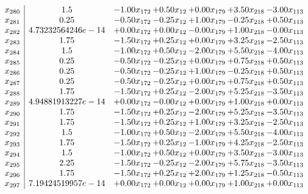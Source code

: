 \documentclass[8pt]{article}
\begin{document}
\[\begin{array}{c| c c@{\hskip 2pt} c@{\hskip 2pt} c@{\hskip 2pt} c@{\hskip 2pt} c@{\hskip 2pt} }
 x_{280}   &  1.5 & -1.00 x_{172} & +  0.50 x_{12} & +  0.00 x_{179} & +  3.50 x_{218} & -3.00 x_{113}\\
 x_{281}   &  0.25 & -0.50 x_{172} & -0.25 x_{12} & +  1.00 x_{179} & -0.25 x_{218} & +  0.50 x_{113}\\
 x_{282}   &  4.73232564246e-14 & +  0.00 x_{172} & +  0.00 x_{12} & -0.00 x_{179} & +  1.00 x_{218} & -0.00 x_{113}\\
 x_{283}   &  1.75 & -1.50 x_{172} & +  0.25 x_{12} & +  0.00 x_{179} & +  3.25 x_{218} & -2.50 x_{113}\\
 x_{284}   &  1.5 & -1.00 x_{172} & +  0.50 x_{12} & -2.00 x_{179} & +  5.50 x_{218} & -4.00 x_{113}\\
 x_{285}   &  0.25 & -0.50 x_{172} & -0.25 x_{12} & +  0.00 x_{179} & +  0.75 x_{218} & +  0.50 x_{113}\\
 x_{286}   &  0.25 & -0.50 x_{172} & -0.25 x_{12} & +  1.00 x_{179} & -0.25 x_{218} & +  0.50 x_{113}\\
 x_{287}   &  0.25 & -0.50 x_{172} & -0.25 x_{12} & +  0.00 x_{179} & +  0.75 x_{218} & +  0.50 x_{113}\\
 x_{288}   &  1.75 & -1.50 x_{172} & +  0.25 x_{12} & -2.00 x_{179} & +  5.25 x_{218} & -3.50 x_{113}\\
 x_{289}   &  4.94881913227e-14 & +  0.00 x_{172} & -0.00 x_{12} & +  0.00 x_{179} & +  1.00 x_{218} & +  0.00 x_{113}\\
 x_{290}   &  1.75 & -1.50 x_{172} & +  0.25 x_{12} & -2.00 x_{179} & +  5.25 x_{218} & -3.50 x_{113}\\
 x_{291}   &  1.75 & -1.50 x_{172} & +  0.25 x_{12} & +  1.00 x_{179} & +  3.25 x_{218} & -2.50 x_{113}\\
 x_{292}   &  1.5 & -1.00 x_{172} & +  0.50 x_{12} & -2.00 x_{179} & +  5.50 x_{218} & -4.00 x_{113}\\
 x_{293}   &  1.75 & -1.50 x_{172} & +  0.25 x_{12} & -1.00 x_{179} & +  4.25 x_{218} & -2.50 x_{113}\\
 x_{294}   &  1.5 & -1.00 x_{172} & +  0.50 x_{12} & +  0.00 x_{179} & +  3.50 x_{218} & -3.00 x_{113}\\
 x_{295}   &  2.25 & -1.50 x_{172} & -0.25 x_{12} & -2.00 x_{179} & +  5.75 x_{218} & -3.50 x_{113}\\
 x_{296}   &  1.75 & -1.50 x_{172} & +  0.25 x_{12} & +  2.00 x_{179} & +  1.25 x_{218} & -0.50 x_{113}\\
 x_{297}   &  7.19424519957e-14 & +  0.00 x_{172} & +  0.00 x_{12} & +  0.00 x_{179} & +  1.00 x_{218} & +  0.00 x_{113}\\

\end{array}\]
\end{document}
